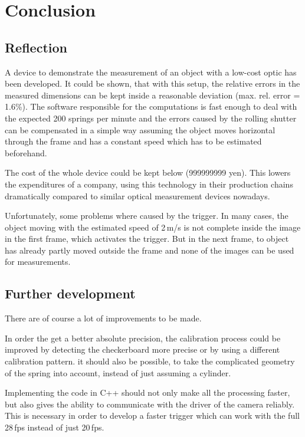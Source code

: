 \chapter{Conclusion}

\section{Reflection}
A device to demonstrate the measurement of an object with a low-cost optic has been developed.
It could be shown, that with this setup, the relative errors in the measured dimensions can be kept inside a reasonable deviation (max. rel. error = 1.6\%).
The software responsible for the computations is fast enough to deal with the expected 200 springs per minute and the errors caused by the rolling shutter can be compensated in a simple way assuming the object moves horizontal through the frame and has a constant speed which has to be estimated beforehand.

The cost of the whole device could be kept below (999999999 yen).
This lowers the expenditures of a company, using this technology in their production chains dramatically compared to similar optical measurement devices nowadays.

Unfortunately, some problems where caused by the trigger.
In many cases, the object moving with the estimated speed of 2\,m/s is not complete inside the image in the first frame, which activates the trigger.
But in the next frame, to object has already partly moved outside the frame and none of the images can be used for measurements.

\section{Further development}
There are of course a lot of improvements to be made.

In order the get a better absolute precision, the calibration process could be improved by detecting the checkerboard more precise or by using a different calibration pattern.
it should also be possible, to take the complicated geometry of the spring into account, instead of just assuming a cylinder.

Implementing the code in C++ should not only make all the processing faster, but also gives the ability to communicate with the driver of the camera reliably.
This is necessary in order to develop a faster trigger which can work with the full 28\,fps instead of just 20\,fps.


